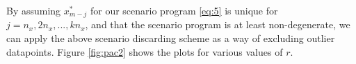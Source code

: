 \documentclass[11pt]{article}
\begin{document}
By assuming $x^{*}_{m-j}$ for our scenario program \ref{eq:5} is unique for $j=n_{x},2n_{x},...,kn_{x}$, and that the scenario program is at least non-degenerate, we can apply the above scenario discarding scheme as a way of excluding outlier datapoints. Figure \ref{fig:pac2} shows the plots for various values of $r$.



\begin{figure}[!htb]
	\centering
	\hfill
	\hfill
    \caption{}

\end{figure}
\end{document}
